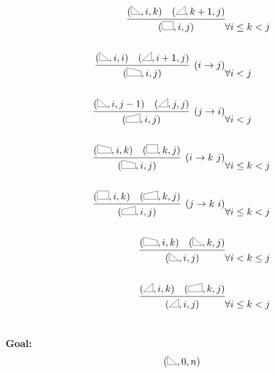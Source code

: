 \documentclass{article}
\begin{document}
\begin{eqnarray*}
\infer{(\abox, i,j)}{(\rtri, i,k)  &  (\ltri, k+1, j) } &  \forall i\leq k < j \\\\
\infer[(i \rightarrow j)]{(\rtrap, i,j)}{(\rtri, i,i)  &  (\ltri, i+1, j) } &  \forall i < j \\\\
\infer[(j \rightarrow i)]{(\ltrap, i,j)}{(\rtri, i,j-1)  &  (\ltri, j, j) } & \forall i < j \\\\
\infer[(i \rightarrow k\ j)]{(\rtrap, i,j)}{(\rtrap, i,k)  &  (\abox, k, j) } &  \forall i\leq k < j \\\\
\infer[(j \rightarrow k\ i)]{(\ltrap, i,j)}{(\abox, i,k)  &  (\ltrap, k, j) } &  \forall i\leq k < j \\\\
\infer{(\rtri, i,j)}{(\rtrap, i,k)  &  (\rtri, k, j) }    &  \forall i<  k \leq j \\\\
\infer{(\ltri, i,j)}{(\ltri, i,k)  &  (\ltrap, k, j) }  & \forall i\leq k < j \\\\
\end{eqnarray*}

\textbf{Goal:}\[ (\rtri, 0,n)\]






\end{document}
